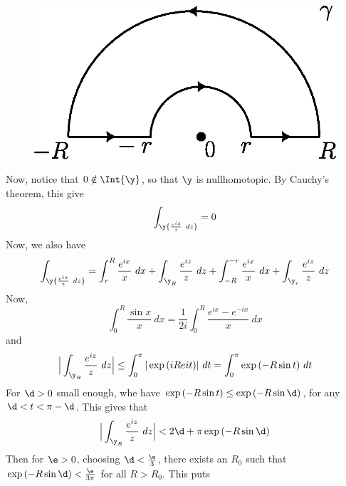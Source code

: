 \begin{example}
\begin{enumerate}
       \begin{figure}[h]
           \centering
           \includegraphics[scale=0.5]{Figures/chapter5/contour_2.eps}
           \caption{}
           \label{figure_5.4}
       \end{figure}
       Now, notice that $0 \notin \Int{\y}$, so that $\y$ is nullhomotopic. By
       Cauchy's theorem, this give
       \begin{equation*}
           \int_\y{\frac{e^{iz}}{z} \ dz}=0
       \end{equation*}
       Now, we also have
       \begin{equation*}
           \int_\y{\frac{e^{iz}}{z} \ dz}=
           \int_r^R{\frac{e^{ix}}{x} \ dx}+
           \int_{\y_R}{\frac{e^{iz}}{z} \ dz}+
           \int_{-R}^{-r}{\frac{e^{ix}}{x} \ dx}+
           \int_{\y_r}{\frac{e^{iz}}{z} \ dz}
       \end{equation*}
       Now,
       \begin{equation*}
           \int_0^R{\frac{\sin{x}}{x} \
           dx}=\frac{1}{2i}\int_0^R{\frac{e^{ix}-e^{-ix}}{x} \ dx}
       \end{equation*}
       and
       \begin{equation*}
           \Big{|} \int_{\y_R}{\frac{e^{iz}}{z} \ dz} \Big{|} \leq
           \int_0^\pi{|\exp{(iRe{it})}| \ dt}=\int_0^\pi{\exp{(-R\sin{t})} \ dt}
       \end{equation*}
       For $\d>0$ small enough, whe have  $\exp{(-R\sin{t})} \leq
       \exp{(-R\sin{\d})}$, for any $\d<t<\pi-\d$. This gives that
       \begin{equation*}
           \Big{|} \int_{\y_R}{\frac{e^{iz}}{z} \ dz}
           \Big{|}<2\d+\pi\exp{(-R\sin{\d})}
       \end{equation*}
       Then for $\e>0$, choosing  $\d<\frac{\e}{3}$, there exists an $R_0$ such
       that $\exp{(-R\sin{\d})}<\frac{\e}{3\pi}$ for all $R>R_0$. This puts

\end{enumerate}
\end{example}
